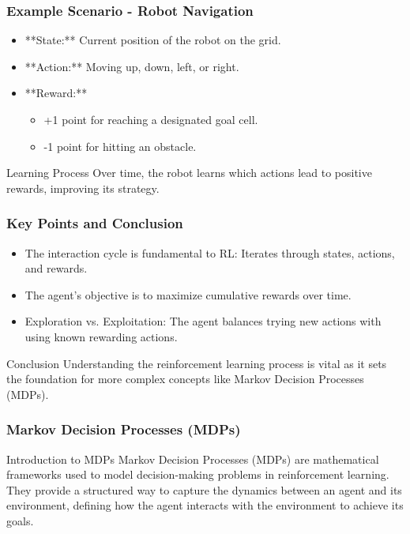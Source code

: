 \documentclass[aspectratio=169]{beamer}
\begin{document}
\begin{frame}[fragile]
    \frametitle{Example Scenario - Robot Navigation}
    
    \begin{itemize}
        \item **State:** Current position of the robot on the grid.
        \item **Action:** Moving up, down, left, or right.
        \item **Reward:** 
            \begin{itemize}
                \item +1 point for reaching a designated goal cell.
                \item -1 point for hitting an obstacle.
            \end{itemize}
    \end{itemize}
    
    \begin{block}{Learning Process}
        Over time, the robot learns which actions lead to positive rewards, improving its strategy.
    \end{block}
\end{frame}

\begin{frame}[fragile]
    \frametitle{Key Points and Conclusion}
    
    \begin{itemize}
        \item The interaction cycle is fundamental to RL: Iterates through states, actions, and rewards.
        \item The agent's objective is to maximize cumulative rewards over time.
        \item Exploration vs. Exploitation: The agent balances trying new actions with using known rewarding actions.
    \end{itemize}
    
    \begin{block}{Conclusion}
        Understanding the reinforcement learning process is vital as it sets the foundation for more complex concepts like Markov Decision Processes (MDPs).
    \end{block}
\end{frame}

\begin{frame}[fragile]
    \frametitle{Markov Decision Processes (MDPs)}
    \begin{block}{Introduction to MDPs}
        Markov Decision Processes (MDPs) are mathematical frameworks used to model decision-making problems in reinforcement learning. They provide a structured way to capture the dynamics between an agent and its environment, defining how the agent interacts with the environment to achieve its goals.
    \end{block}
\end{frame}
\end{document}

